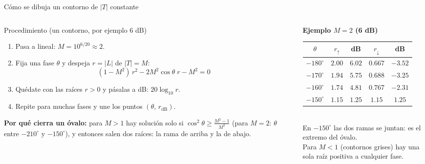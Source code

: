 \documentclass[aspectratio=169,11pt]{beamer}
\begin{document}
\begin{frame}{Cómo se dibuja un contorno de $|T|$ constante}
  \footnotesize
  \begin{columns}[T]
  \begin{column}{0.54\textwidth}
    \begin{block}{Procedimiento (un contorno, por ejemplo $6$ dB)}
      \begin{enumerate}
        \item Pasa a lineal: $M=10^{6/20}\approx2$.
        \item Fija una fase $\theta$ y despeja $r=|L|$ de $|T|=M$:
        \[ (1-M^2)\,r^2-2M^2\cos\theta\; r-M^2=0 \]
        \item Quédate con las raíces $r>0$ y pásalas a dB: $20\log_{10}r$.
        \item Repite para muchas fases y une los puntos $(\theta,\,r_{\text{dB}})$.
      \end{enumerate}
    \end{block}
    \textbf{Por qué cierra un óvalo:} para $M>1$ hay solución solo si $\cos^2\theta\ge\frac{M^2-1}{M^2}$ (para $M=2$: $\theta$ entre $-210^\circ$ y $-150^\circ$), y entonces salen dos raíces: la rama de arriba y la de abajo.
  \end{column}
  \begin{column}{0.44\textwidth}
    \centering
    \textbf{Ejemplo $M=2$ (6 dB)}\\[2pt]
    \begin{tabular}{c|cc|cc}
      $\theta$ & $r_{\uparrow}$ & dB & $r_{\downarrow}$ & dB\\\hline
      $-180^\circ$ & $2.00$ & $6.02$ & $0.667$ & $-3.52$\\
      $-170^\circ$ & $1.94$ & $5.75$ & $0.688$ & $-3.25$\\
      $-160^\circ$ & $1.74$ & $4.81$ & $0.767$ & $-2.31$\\
      $-150^\circ$ & $1.15$ & $1.25$ & $1.15$ & $1.25$
    \end{tabular}\\[4pt]
    En $-150^\circ$ las dos ramas se juntan: es el extremo del óvalo.\\[3pt]
    Para $M<1$ (contornos grises) hay una sola raíz positiva a cualquier fase.
  \end{column}
  \end{columns}
\end{frame}
\end{document}
